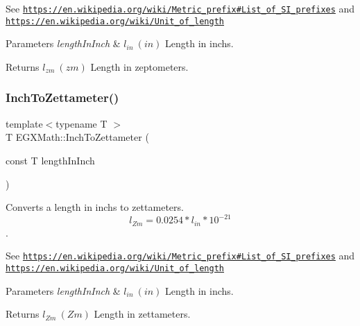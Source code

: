 See \href{https://en.wikipedia.org/wiki/Metric_prefix#List_of_SI_prefixes}{\tt https\+://en.\+wikipedia.\+org/wiki/\+Metric\+\_\+prefix\#\+List\+\_\+of\+\_\+\+S\+I\+\_\+prefixes} and \href{https://en.wikipedia.org/wiki/Unit_of_length}{\tt https\+://en.\+wikipedia.\+org/wiki/\+Unit\+\_\+of\+\_\+length} 
\begin{DoxyParams}{Parameters}
{\em length\+In\+Inch} & $ l_{in}\ (in)$ Length in inchs. \\
\hline
\end{DoxyParams}
\begin{DoxyReturn}{Returns}
$ l_{zm}\ (zm)$ Length in zeptometers. 
\end{DoxyReturn}
\mbox{\label{group___e_g_x_math-_conversions-_length_conversions-_imperial-_inch-_s_i_ga8d295c602a67bb5218b47d7a6c054243}} 
\subsubsection{\texorpdfstring{Inch\+To\+Zettameter()}{InchToZettameter()}}
{\footnotesize\ttfamily template$<$typename T $>$ \\
T E\+G\+X\+Math\+::\+Inch\+To\+Zettameter (\begin{DoxyParamCaption}\item[{const T}]{length\+In\+Inch }\end{DoxyParamCaption})}



Converts a length in inchs to zettameters. \[ l_{Zm}=0.0254 * l_{in} * 10^{-21} \]. 

See \href{https://en.wikipedia.org/wiki/Metric_prefix#List_of_SI_prefixes}{\tt https\+://en.\+wikipedia.\+org/wiki/\+Metric\+\_\+prefix\#\+List\+\_\+of\+\_\+\+S\+I\+\_\+prefixes} and \href{https://en.wikipedia.org/wiki/Unit_of_length}{\tt https\+://en.\+wikipedia.\+org/wiki/\+Unit\+\_\+of\+\_\+length} 
\begin{DoxyParams}{Parameters}
{\em length\+In\+Inch} & $ l_{in}\ (in)$ Length in inchs. \\
\hline
\end{DoxyParams}
\begin{DoxyReturn}{Returns}
$ l_{Zm}\ (Zm)$ Length in zettameters. 
\end{DoxyReturn}
